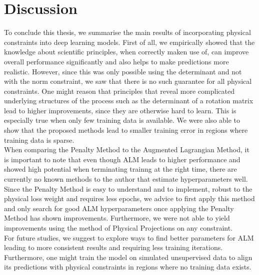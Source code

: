 \label{section:discussion}
\section{Discussion}

To conclude this thesis, we summarise the main results of incorporating physical constraints into deep learning models. First of all, we empirically showed that the knowledge about scientific principles, when correctly maken use of, can improve overall performance significantly and also helps to make predictions more realistic. However, since this was only possible using the determinant and not with the norm constraint, we saw that there is no such guarantee for all physical constraints. One might reason that principles that reveal more complicated underlying structures of the process such as the determinant of a rotation matrix lead to higher improvements, since they are otherwise hard to learn. This is especially true when only few training data is available. We were also able to show that the proposed methods lead to smaller training error in regions where training data is sparse.\\
\indent When comparing the Penalty Method to the Augmented Lagrangian Method, it is important to note that even though ALM leads to higher performance and showed high potential when terminating trainng at the right time, there are currently no known methods to the author that estimate hyperparameters well. Since the Penalty Method is easy to understand   and to implement, robust to the physical loss weight and requires less epochs, we advice to first apply this method and only search for good ALM hyperparameters once applying the Penalty Method has shown improvements. Furthermore, we were not able to yield improvements using the method of Physical Projections on any constraint.\\
\indent For future studies, we suggest to explore ways to find better parameters for ALM leading to more consistent results and requiring less training iterations. Furthermore, one might train the model on simulated unsupervised data to align its predictions with physical constraints in regions where no training data exists.









\clearpage

